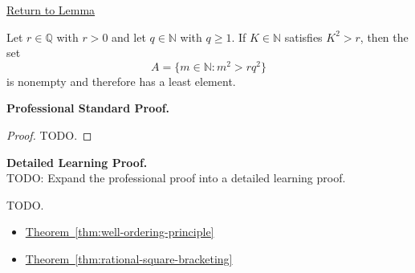 \newpage
{}
\label{prf:first-grid-point-crossing}

\begin{remark*}[Return]
\hyperref[lem:first-grid-point-crossing]{Return to Lemma}
\end{remark*}

\begin{theorem*}
Let $r\in\mathbb{Q}$ with $r>0$ and let $q\in\mathbb{N}$ with $q\ge 1$.
If $K\in\mathbb{N}$ satisfies $K^2>r$, then the set
\[
A=\{m\in\mathbb{N}:m^2>rq^2\}
\]
is nonempty and therefore has a least element.
\end{theorem*}

\textbf{Professional Standard Proof.}~\\
\begin{proof}
TODO.
\end{proof}

\textbf{Detailed Learning Proof.}~\\
TODO: Expand the professional proof into a detailed learning proof.


\begin{remark*}
TODO.
\end{remark*}

\begin{dependencies}
\begin{itemize}
  \item \hyperref[thm:well-ordering-principle]{Theorem~\ref*{thm:well-ordering-principle}}
  \item \hyperref[thm:rational-square-bracketing]{Theorem~\ref*{thm:rational-square-bracketing}}
\end{itemize}
\end{dependencies}
